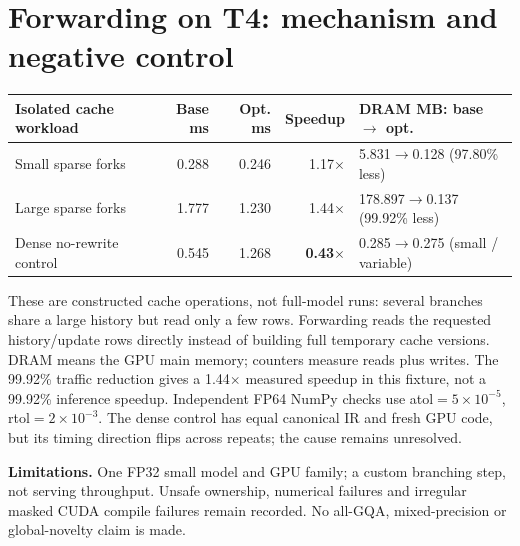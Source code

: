\documentclass[10pt,a4paper]{article}
\newcommand{\smallnote}[1]{{\footnotesize #1\par}}
\begin{document}
\section{Forwarding on T4: mechanism and negative control}
{\small
\begin{tabularx}{\linewidth}{@{}Y r r r P{36mm}@{}}
\toprule
\textbf{Isolated cache workload} & \textbf{Base ms} & \textbf{Opt. ms} & \textbf{Speedup} & \textbf{DRAM MB: base $\to$ opt.}\\
\midrule
Small sparse forks&0.288&0.246&1.17$\times$&5.831$\to$0.128 (97.80\% less)\\
Large sparse forks&1.777&1.230&1.44$\times$&178.897$\to$0.137 (99.92\% less)\\
Dense no-rewrite control&0.545&1.268&\textbf{0.43$\times$}&0.285$\to$0.275 (small / variable)\\
\bottomrule
\end{tabularx}}
\smallnote{These are constructed cache operations, not full-model runs: several branches share a large history but read only a few rows. Forwarding reads the requested history/update rows directly instead of building full temporary cache versions. DRAM means the GPU main memory; counters measure reads plus writes. The 99.92\% traffic reduction gives a 1.44$\times$ measured speedup in this fixture, not a 99.92\% inference speedup. Independent FP64 NumPy checks use atol$=5\!\times\!10^{-5}$, rtol$=2\!\times\!10^{-3}$. The dense control has equal canonical IR and fresh GPU code, but its timing direction flips across repeats; the cause remains unresolved.}

\textbf{Limitations.} One FP32 small model and GPU family; a custom branching step, not serving throughput. Unsafe ownership, numerical failures and irregular masked CUDA compile failures remain recorded. No all-GQA, mixed-precision or global-novelty claim is made.
\end{document}
